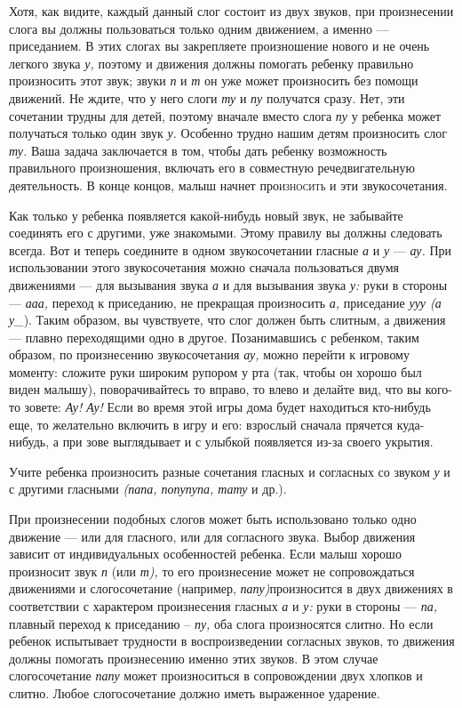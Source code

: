 \documentclass[a5paper]{book}
\renewcommand{\emph}[1]{\textit{#1}}
\begin{document}
Хотя, как видите, каждый данный слог состоит из двух звуков, при
произнесении слога вы должны пользоваться только одним движением, а
именно --- приседанием. В этих слогах вы закрепляете произношение нового
и не очень легкого звука \emph{у,} поэтому и движения должны помогать
ребенку правильно произносить этот звук; звуки \emph{п} и \emph{т} он
уже может произносить без помощи движений. Не ждите, что у него слоги
\emph{ту} и \emph{пу} получатся сразу. Нет, эти сочетании трудны для
детей, поэтому вначале вместо слога \emph{пу} у ребенка может получаться
только один звук \emph{у.} Особенно трудно нашим детям произносить слог
\emph{ту.} Ваша задача заключается в том, чтобы дать ребенку возможность
правильного произношения, включать его в совместную речедвигательную
деятельность. В конце концов, малыш начнет про\textsc{износить} и эти
звукосочетания.

Как только у ребенка появляется какой-нибудь новый звук, не забывайте
соединять его с другими, уже знакомыми. Этому правилу вы должны
следовать всегда. Вот и теперь соедините в одном звукосочетании гласные
\emph{а} и \emph{у} --- \emph{ау.} При использовании этого
звукосочетания можно сначала пользоваться двумя движениями --- для
вызывания звука \emph{а} и для вызывания звука \emph{у:} руки в стороны
--- \emph{ааа,} переход к приседанию, не прекращая произносить \emph{а,}
приседание \emph{ууу (а у\_}). Таким образом, вы чувствуете, что слог
должен быть слитным, а движения --- плавно переходящими одно в другое.
Позанимавшись с ребенком, таким образом, по произнесению звукосочетания
\emph{ау,} можно перейти к игровому моменту: сложите руки широким
рупором у рта (так, чтобы он хорошо был виден малышу), поворачивайтесь
то вправо, то влево и делайте вид, что вы кого-то зовете: \emph{Ау! Ау!}
Если во время этой игры дома будет находиться кто-нибудь еще, то
желательно включить в игру и его: взрослый сначала прячется куда-нибудь,
а при зове выглядывает и с улыбкой появляется из-за своего укрытия.

Учите ребенка произносить разные сочетания гласных и согласных со звуком
\emph{у} и с другими гласными \emph{(папа, попупупа, тату} и др.).

При произнесении подобных слогов может быть использовано только одно
движение --- или для гласного, или для согласного звука. Выбор движения
зависит от индивидуальных особенностей ребенка. Если малыш хорошо
произносит звук \emph{п} (или \emph{т),} то его произнесение может не
сопровождаться движениями и слогосочетание (например,
\emph{папу)}произносится в двух движениях в соответствии с характером
произнесения гласных \emph{а} и \emph{у:} руки в стороны --- \emph{па,}
плавный переход к приседанию -- \emph{пу,} оба слога произносятся
слитно. Но если ребенок испытывает трудности в воспроизведении согласных
звуков, то движения должны помогать произнесению именно этих звуков. В
этом случае слогосочетание \emph{папу} может произноситься в
сопровождении двух хлопков и слитно. Любое слогосочетание должно иметь
выраженное ударение.
\end{document}
